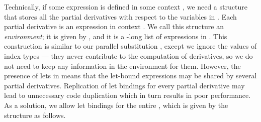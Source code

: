 Technically, if some expression  is defined in some context ,
we need a structure that stores all the partial derivatives with respect
to the variables in .  Each partial
derivative is an expression  in context .  We call this
structure an \emph{environment}; it is given by , and it is
a -long list of expressions in .
This  construction is
similar to our parallel substitution , except we ignore the values of index
types --- they never contribute to the computation of derivatives, so we do not need to
keep any information in the environment for them.  However, the presence of lets in 
means that the let-bound expressions may be shared by several partial derivatives.
Replication of let bindings for every partial derivative
may lead to unnecessary code duplication which in turn results in
poor performance.  As a solution, we allow let bindings for the entire ,
which is given by the  structure as follows.
